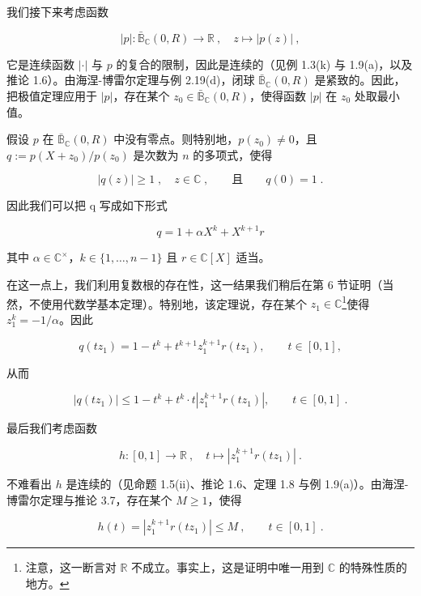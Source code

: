 \begin{example}
\begin{items}
\begin{subitems}
\item

我们接下来考虑函数

\[
|p|:\bar{\mathbb{B}}_{\mathbb{C}}(0,R)\to\mathbb{R}~,\quad z\mapsto|p(z)|~,
\]

它是连续函数 $ |\cdot| $ 与 $ p $ 的复合的限制，因此是连续的（见例 1.3(k) 与 1.9(a)，以及推论 1.6）。由海涅-博雷尔定理与例 2.19(d)，闭球 $ \bar{\mathbb{B}}_{\mathbb{C}}(0,R) $ 是紧致的。因此，把极值定理应用于 $ |p| $，存在某个 $ z_0 \in \bar{\mathbb{B}}_{\mathbb{C}}(0,R) $，使得函数 $ |p| $ 在 $ z_0 $ 处取最小值。

\item

假设 $p$ 在 $\bar{\mathbb{B}}_{\mathbb{C}}(0,R)$ 中没有零点。则特别地，$p(z_0) \neq 0$，且 $q := p(X + z_0)/p(z_0)$ 是次数为 $n$ 的多项式，使得

\begin{equation}
|q(z)|\geq1\;,\quad z\in\mathbb{C}\;,\qquad\text{且}\qquad q(0)=1\;.
\end{equation}

因此我们可以把 q 写成如下形式

\[
q=1+\alpha X^{k}+X^{k+1}r
\]

其中 $ \alpha \in \mathbb{C}^{\times} $，$ k \in \{1, \ldots, n-1\} $ 且 $ r \in \mathbb{C}[X] $ 适当。

\item

在这一点上，我们利用复数根的存在性，这一结果我们稍后在第 6 节证明（当然，不使用代数学基本定理）。特别地，该定理说，存在某个 $ z_1 \in \mathbb{C} $\footnote{注意，这一断言对 $ \mathbb{R} $ 不成立。事实上，这是证明中唯一用到 $ \mathbb{C} $ 的特殊性质的地方。}使得 $ z_1^k = -1/\alpha $。因此

\[
q(t z_{1})=1-t^{k}+t^{k+1}z_{1}^{k+1}r(t z_{1}),\qquad t\in[0,1],
\]

从而

\[
|q(t z_{1})|\leq1-t^{k}+t^{k}\cdot t\left|z_{1}^{k+1}r(t z_{1})\right|,\qquad t\in[0,1]~.
\]
\item

最后我们考虑函数

\[
h\colon[0,1]\to\mathbb{R}~,\quad t\mapsto|z_{1}^{k+1}r(t z_{1})|~.
\]

不难看出 $h$ 是连续的（见命题 1.5(ii)、推论 1.6、定理 1.8 与例 1.9(a)）。由海涅-博雷尔定理与推论 3.7，存在某个 $M \geq 1$，使得

\begin{equation}
h(t)=|z_{1}^{k+1}r(t z_{1})|\leq M~,\qquad t\in[0,1]~.
\end{equation}


\end{subitems}
\end{items}
\end{example}
